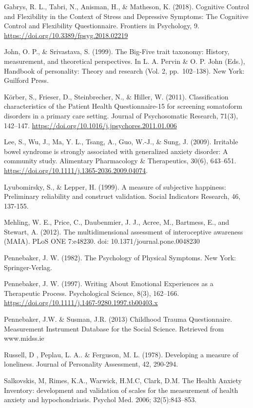 \documentclass[]{book}
\begin{document}
Gabrys, R. L., Tabri, N., Anisman, H., \& Matheson, K. (2018). Cognitive Control and Flexibility in the Context of Stress and Depressive Symptoms: The Cognitive Control and Flexibility Questionnaire. Frontiers in Psychology, 9. \url{https://doi.org/10.3389/fpsyg.2018.02219}

John, O. P., \& Srivastava, S. (1999). The Big-Five trait taxonomy: History, measurement, and theoretical perspectives. In L. A. Pervin \& O. P. John (Eds.), Handbook of personality: Theory and research (Vol. 2, pp.~102--138). New York: Guilford Press.

Körber, S., Frieser, D., Steinbrecher, N., \& Hiller, W. (2011). Classification characteristics of the Patient Health Questionnaire-15 for screening somatoform disorders in a primary care setting. Journal of Psychosomatic Research, 71(3), 142--147. \url{https://doi.org/10.1016/j.jpsychores.2011.01.006}

Lee, S., Wu, J., Ma, Y. L., Tsang, A., Guo, W.-J., \& Sung, J. (2009). Irritable bowel syndrome is strongly associated with generalized anxiety disorder: A community study. Alimentary Pharmacology \& Therapeutics, 30(6), 643--651. \url{https://doi.org/10.1111/j.1365-2036.2009.04074}.

Lyubomirsky, S., \& Lepper, H. (1999). A measure of subjective happiness: Preliminary reliability and construct validation. Social Indicators Research, 46, 137-155.

Mehling, W. E., Price, C., Daubenmier, J. J., Acree, M., Bartmess, E., and Stewart, A. (2012). The multidimensional assessment of interoceptive awareness (MAIA). PLoS ONE 7:e48230. doi: 10.1371/journal.pone.0048230

Pennebaker, J. W. (1982). The Psychology of Physical Symptoms. New York: Springer-Verlag.

Pennebaker, J. W. (1997). Writing About Emotional Experiences as a Therapeutic Process. Psychological Science, 8(3), 162--166. \url{https://doi.org/10.1111/j.1467-9280.1997.tb00403.x}

Pennebaker, J.W. \& Susman, J.R. (2013) Childhood Trauma Questionnaire. Measurement Instrument Database for the Social Science. Retrieved from www.midss.ie

Russell, D , Peplau, L. A.. \& Ferguson, M. L. (1978). Developing a measure of loneliness.
Journal of Personality Assessment, 42, 290-294.

Salkovskis, M, Rimes, K.A., Warwick, H.M.C, Clark, D.M. The Health Anxiety Inventory: development and validation of scales for the measurement of health anxiety and hypochondriasis. Psychol Med. 2006; 32(5):843--853.
\end{document}
